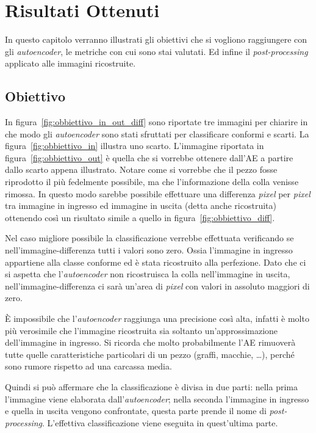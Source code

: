 
\chapter{Risultati Ottenuti}
In questo capitolo verranno illustrati gli obiettivi che si vogliono raggiungere con gli \textit{autoencoder}, le metriche con cui sono stai valutati.
Ed infine il \textit{post-processing} applicato alle immagini ricostruite.

\section{Obiettivo}
In figura~\ref{fig:obbiettivo_in_out_diff} sono riportate tre immagini per chiarire in che modo gli \textit{autoencoder} sono stati sfruttati per classificare conformi e scarti.
La figura~\ref{fig:obbiettivo_in} illustra uno scarto.
L'immagine riportata in figura~\ref{fig:obbiettivo_out} è quella che si vorrebbe ottenere dall'AE a partire dallo scarto appena illustrato.
Notare come si vorrebbe che il pezzo fosse riprodotto il più fedelmente possibile, ma che l'informazione della colla venisse rimossa.
In questo modo sarebbe possibile effettuare una differenza \textit{pixel} per \textit{pixel} tra immagine in ingresso ed immagine in uscita (detta anche ricostruita) ottenendo così un risultato simile a quello in figura~\ref{fig:obbiettivo_diff}.

Nel caso migliore possibile la classificazione verrebbe effettuata verificando se nell'immagine-differenza tutti i valori sono zero.
Ossia l'immagine in ingresso appartiene alla classe conforme ed è stata ricostruito alla perfezione.
Dato che ci si aspetta che l'\textit{autoencoder} non ricostruisca la colla nell'immagine in uscita, nell'immagine-differenza ci sarà un'area di \textit{pixel} con valori in assoluto maggiori di zero.

È impossibile che l'\textit{autoencoder} raggiunga una precisione così alta, infatti è molto più verosimile che l'immagine ricostruita sia soltanto un'approssimazione dell'immagine in ingresso.
Si ricorda che molto probabilmente l'AE rimuoverà tutte quelle caratteristiche particolari di un pezzo (graffi, macchie, \dots ), perché sono rumore rispetto ad una carcassa media.

Quindi si può affermare che la classificazione è divisa in due parti: nella prima l'immagine viene elaborata dall'\textit{autoencoder}; nella seconda l'immagine in ingresso e quella in uscita vengono confrontate, questa parte prende il nome di \textit{post-processing}.
L'effettiva classificazione viene eseguita in quest'ultima parte.

